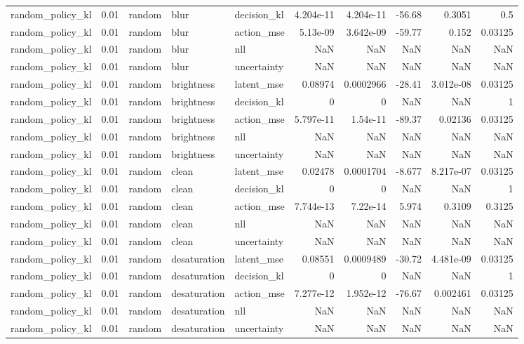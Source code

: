 \begin{tabular}{lrlllrrrrr}
random\_policy\_kl & 0.01 & random & blur & decision\_kl & 4.204e-11 & 4.204e-11 & -56.68 & 0.3051 & 0.5 \\
random\_policy\_kl & 0.01 & random & blur & action\_mse & 5.13e-09 & 3.642e-09 & -59.77 & 0.152 & 0.03125 \\
random\_policy\_kl & 0.01 & random & blur & nll & NaN & NaN & NaN & NaN & NaN \\
random\_policy\_kl & 0.01 & random & blur & uncertainty & NaN & NaN & NaN & NaN & NaN \\
random\_policy\_kl & 0.01 & random & brightness & latent\_mse & 0.08974 & 0.0002966 & -28.41 & 3.012e-08 & 0.03125 \\
random\_policy\_kl & 0.01 & random & brightness & decision\_kl & 0 & 0 & NaN & NaN & 1 \\
random\_policy\_kl & 0.01 & random & brightness & action\_mse & 5.797e-11 & 1.54e-11 & -89.37 & 0.02136 & 0.03125 \\
random\_policy\_kl & 0.01 & random & brightness & nll & NaN & NaN & NaN & NaN & NaN \\
random\_policy\_kl & 0.01 & random & brightness & uncertainty & NaN & NaN & NaN & NaN & NaN \\
random\_policy\_kl & 0.01 & random & clean & latent\_mse & 0.02478 & 0.0001704 & -8.677 & 8.217e-07 & 0.03125 \\
random\_policy\_kl & 0.01 & random & clean & decision\_kl & 0 & 0 & NaN & NaN & 1 \\
random\_policy\_kl & 0.01 & random & clean & action\_mse & 7.744e-13 & 7.22e-14 & 5.974 & 0.3109 & 0.3125 \\
random\_policy\_kl & 0.01 & random & clean & nll & NaN & NaN & NaN & NaN & NaN \\
random\_policy\_kl & 0.01 & random & clean & uncertainty & NaN & NaN & NaN & NaN & NaN \\
random\_policy\_kl & 0.01 & random & desaturation & latent\_mse & 0.08551 & 0.0009489 & -30.72 & 4.481e-09 & 0.03125 \\
random\_policy\_kl & 0.01 & random & desaturation & decision\_kl & 0 & 0 & NaN & NaN & 1 \\
random\_policy\_kl & 0.01 & random & desaturation & action\_mse & 7.277e-12 & 1.952e-12 & -76.67 & 0.002461 & 0.03125 \\
random\_policy\_kl & 0.01 & random & desaturation & nll & NaN & NaN & NaN & NaN & NaN \\
random\_policy\_kl & 0.01 & random & desaturation & uncertainty & NaN & NaN & NaN & NaN & NaN \\

\end{tabular}
